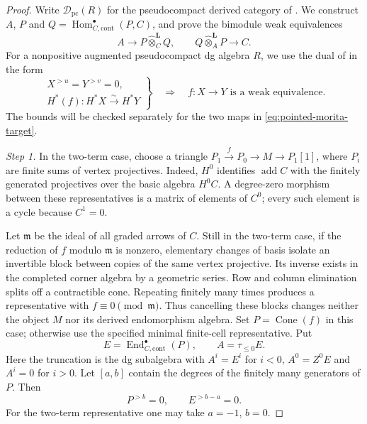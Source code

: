 \documentclass[12pt,a4paper,english,reqno]{amsart}
\theoremstyle{plain}
\theoremstyle{definition}
\numberwithin{equation}{section}
\def\ta{\tau}
\def\Hom{\operatorname{Hom}}
\def\End{\operatorname{End}}
\def\add{\operatorname{add}}
\def\calD{{\mathcal D}}
\def\ox{\otimes}
\def\ya#1{\xrightarrow{#1}}
\def\Cone{\operatorname{Cone}}
\begin{document}
\begin{proof}
Write $\calD_{\mathrm{pc}}(R)$ for the pseudocompact derived category
of \cite[Section 6]{VdB}. We construct $A$, $P$ and
$Q=\Hom^\bullet_{C,\mathrm{cont}}(P,C)$, and prove the bimodule weak
equivalences
\begin{equation}\label{eq:pointed-morita-target}
 A\longrightarrow P\widehat\ox_C^{\mathbf L}Q,
 \qquad Q\widehat\ox_A^{\mathbf L}P\longrightarrow C.
\end{equation}
For a nonpositive augmented pseudocompact dg algebra $R$, we use
the dual of \cite[Lemma A.2.1]{VdB} in the form
\begin{equation}\label{eq:pc-bounded-test}
 \left.
 \begin{gathered}
 X^{>u}=Y^{>v}=0,\\
 H^*(f):H^*X\xrightarrow{\sim}H^*Y
 \end{gathered}
 \right\}
 \quad\Longrightarrow\quad
 f:X\to Y\text{ is a weak equivalence}.
\end{equation}
The bounds will be checked separately for the two maps in
\eqref{eq:pointed-morita-target}.

\medskip\noindent\emph{Step 1.}
In the two-term case, choose a triangle $P_1\ya{f}P_0\to M\to P_1[1]$, where $P_i$ are finite sums of vertex projectives. Indeed, $H^0$ identifies $\add C$ with the finitely generated projectives over the basic algebra $H^0C$. A degree-zero morphism between these representatives is a matrix of elements of $C^0$; every such element is a cycle because $C^1=0$.

Let $\mathfrak m$ be the ideal of all graded arrows of $C$. Still in the two-term case, if the reduction of $f$ modulo $\mathfrak m$ is nonzero, elementary changes of basis isolate an invertible block between copies of the same vertex projective. Its inverse exists in the completed corner algebra by a geometric series. Row and column elimination splits off a contractible cone. Repeating finitely many times produces a representative with $f\equiv0\pmod{\mathfrak m}$. Thus cancelling these blocks changes neither the object $M$ nor its derived endomorphism algebra. Set $P=\Cone(f)$ in this case; otherwise use the specified minimal finite-cell representative. Put
\[
 E=\End^\bullet_{C,\mathrm{cont}}(P),\qquad
 A=\ta_{\le0}E.
\]
Here the truncation is the dg subalgebra with $A^i=E^i$ for $i<0$, $A^0=Z^0E$ and $A^i=0$ for $i>0$. Let $[a,b]$ contain the degrees of the finitely many generators of $P$. Then
\[
 P^{>b}=0,\qquad E^{>b-a}=0.
\]
For the two-term representative one may take $a=-1$, $b=0$.


\end{proof}
\end{document}
